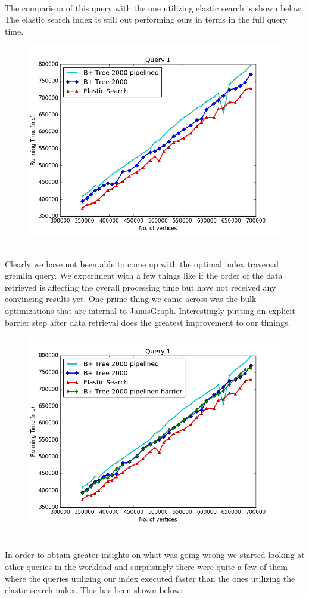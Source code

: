 $\:$\\
The comparison of this query with the one utilizing elastic search is shown below. The elastic search index is still out performing ours in terms in the full query time. 

\begin{figure}[H]
\centering
\includegraphics[width=.8\linewidth]{Figures/figure_1-200}
\label{fig:test1}
\end{figure}
$\:$\\
Clearly we have not been able to come up with the optimal index traversal gremlin query. We experiment with a few things like if the order of the data retrieved is affecting the overall processing time but have not received any convincing results yet. One prime thing we came across was the bulk optimizations that are internal to JanusGraph. Interestingly putting an explicit barrier step after data retrieval does the greatest improvement to our timings.
\begin{figure}[H]
\centering
\includegraphics[width=.8\linewidth]{Figures/figure_1-300}
\label{fig:test1}
\end{figure}
$\:$\\
In order to obtain greater insights on what was going wrong we started looking at other queries in the workload and surprisingly there were quite a few of them where the queries utilizing our index executed faster than the ones utilizing the elastic search index. This has been shown below:

